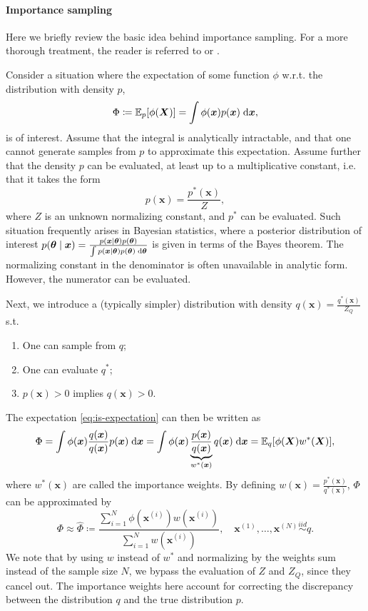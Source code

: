 \paragraph{Importance sampling}
Here we briefly review the basic idea behind importance sampling. For a more thorough treatment, the reader is referred to \cite{information-theory} or \cite{robert-casella}.

Consider a situation where the expectation of some function $\phi$ w.r.t. the distribution with density $p$,
\begin{equation} \label{eq:is-expectation}
\Phi \coloneqq \mathbb{E}_{p}[\phi(\bm{X})] = \int \phi(\bm{x}) p(\bm{x}) \; \mathrm{d}{\bm{x}},
\end{equation}
is of interest. Assume that the integral is analytically intractable, and that one cannot generate samples from $p$ to approximate this expectation. Assume further that the density $p$ can be evaluated, at least up to a multiplicative constant, i.e. that it takes the form
\begin{equation*}
p(\bm{x}) = \frac{p^*(\bm{x})}{Z},
\end{equation*}
where $Z$ is an unknown normalizing constant, and $p^*$ can be evaluated. Such situation frequently arises in Bayesian statistics, where a posterior distribution of interest ${p(\bm{\theta} \mid \bm{x}) = \frac{p(\bm{x} \mid \bm{\theta}) p(\bm{\theta})}{\int p(\bm{x} \mid \bm{\theta}) p(\bm{\theta}) \; \mathrm{d}{\bm{\theta}}}}$ is given in terms of the Bayes theorem. The normalizing constant in the denominator is often unavailable in analytic form. However, the numerator can be evaluated.

Next, we introduce a (typically simpler) distribution with density $q(\bm{x}) = \frac{q^*(\bm{x})}{Z_Q}$ s.t.
\begin{enumerate}
    \item One can sample from $q$;
    \item One can evaluate $q^*$;
    \item $p(\bm{x}) > 0$ implies $q(\bm{x}) > 0$.
\end{enumerate}
The expectation \eqref{eq:is-expectation} can then be written as
\begin{equation*}
\Phi = \int \phi(\bm{x}) \frac{q(\bm{x})}{q(\bm{x})} p(\bm{x}) \; \mathrm{d}{\bm{x}} = \int \phi(\bm{x}) \underbrace{\frac{p(\bm{x})}{q(\bm{x})}}_{w^*(\bm{x})} q(\bm{x}) \; \mathrm{d}{\bm{x}} = \mathbb{E}_{q}[\phi(\bm{X}) w^*(\bm{X})],
\end{equation*}
where $w^*(\bm{x})$ are called the importance weights. By defining $w(\bm{x}) = \frac{p^*(\bm{x})}{q^*(\bm{x})}$, $\Phi$ can be approximated by
\begin{equation*}
\Phi \approx \widehat{\Phi} \coloneqq \frac{\sum_{i=1}^N \phi(\bm{x}^{(i)}) w(\bm{x}^{(i)})}{\sum_{i=1}^Nw(\bm{x}^{(i)})}, \quad \bm{x}^{(1)}, \ldots, \bm{x}^{(N)} \stackrel{iid}{\sim} q.
\end{equation*}
We note that by using $w$ instead of $w^*$ and normalizing by the weights sum instead of the sample size $N$, we bypass the evaluation of $Z$ and $Z_Q$, since they cancel out. The importance weights here account for correcting the discrepancy between the distribution $q$ and the true distribution $p$.

